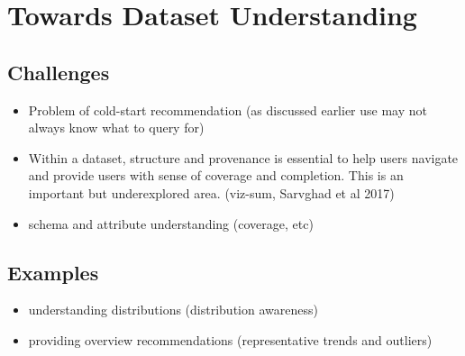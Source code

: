 \section{Towards Dataset Understanding}
\subsection{Challenges}
\begin{itemize}
\item Problem of cold-start recommendation (as discussed earlier use may not always know what to query for)
\item Within a dataset, structure and provenance is essential to help users navigate and provide users with sense of coverage and completion. This is an important but underexplored area. (viz-sum, Sarvghad et al 2017)
\item schema and attribute understanding (coverage, etc) 
\end{itemize}

\subsection{Examples}
\begin{itemize}
	\item understanding distributions (distribution awareness)
	\item providing overview recommendations (representative trends and outliers)
\end{itemize}